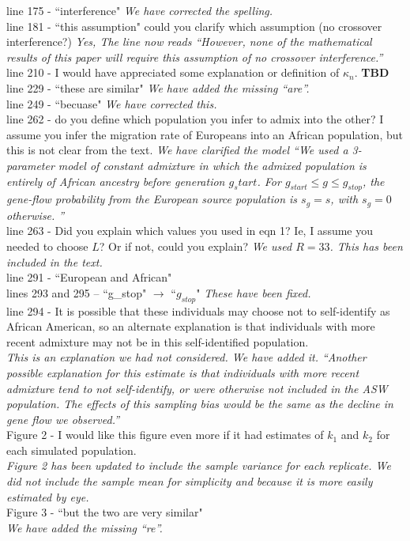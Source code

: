 \documentclass[11pt]{amsart}
\begin{document}
line 175 - ``interference" \textit{We have corrected the spelling.}\\
line 181 - ``this assumption" could you clarify which assumption (no crossover interference?) \textit{Yes, The line now reads ``However, none of the mathematical results of this paper will require this assumption of no crossover interference.''}\\
line 210 - I would have appreciated some explanation or definition of $\kappa_n$. \textbf{TBD}\\
line 229 - ``these are similar" \textit{We have added the missing ``are''.}\\
line 249 - ``becuase" \textit{We have corrected this.}\\
line 262 - do you define which population you infer to admix into the other? I assume you infer the migration rate of Europeans into an African population, but this is not clear from the text.
\textit{We have clarified the model ``We used a 3-parameter model of constant admixture in which the admixed population is entirely of African ancestry before generation $g_start$. For $g_{start}\leq g\leq g_{stop}$, the gene-flow probability from the European source population is $s_g=s$, with $s_g=0$ otherwise. ''}\\ 
line 263 - Did you explain which values you used in eqn 1? Ie, I assume you needed to choose $L$? Or if not, could you explain? \textit{We used $R=33$. This has been included in the text.}\\
line 291 - ``European and African" \\
lines 293 and 295 – ``g\_stop" $\rightarrow$ ``$g_{stop}$" \textit{These have been fixed.}\\ 
line 294 - It is possible that these individuals may choose not to self-identify as African American, so an alternate explanation is that individuals with more recent admixture may not be in this self-identified population. \\
\textit{This is an explanation we had not considered. We have added it. ``Another possible explanation for this estimate is that individuals with more recent admixture tend to not self-identify, or were otherwise not included in the ASW population. The effects of this sampling bias would be the same as the decline in gene flow we observed.''}\\
Figure 2 - I would like this figure even more if it had estimates of $k_1$ and $k_2$ for each 
simulated population.\\
\textit{Figure 2 has been updated to include the sample variance for each replicate. We did not include the sample mean for simplicity and because it is more easily estimated by eye.}\\
Figure 3 - ``but the two are very similar"\\
\textit{We have added the missing ``re''.}
\end{document}
